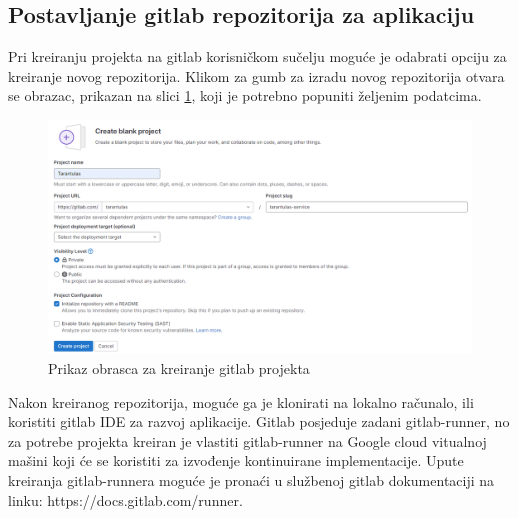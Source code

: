 \documentclass[a4paper,12pt,oneside]{article}
\begin{document}
\subsection{Postavljanje gitlab repozitorija za aplikaciju}

Pri kreiranju projekta na gitlab korisničkom sučelju moguće je odabrati opciju za kreiranje novog repozitorija. Klikom za gumb za izradu novog repozitorija otvara se obrazac, prikazan na slici \ref{fig:git-create-blank}, koji je potrebno popuniti željenim podatcima.

\begin{figure}
    \centering
    \includegraphics[width=1\linewidth]{Slike/git-create-blank-project.png}
    \caption{Prikaz obrasca za kreiranje gitlab projekta \cite{springArchitectureLayers}}
    \label{fig:git-create-blank}
\end{figure}

Nakon kreiranog repozitorija, moguće ga je klonirati na lokalno računalo, ili koristiti gitlab IDE za razvoj aplikacije. Gitlab posjeduje zadani gitlab-runner, no za potrebe projekta kreiran je vlastiti gitlab-runner na Google cloud vitualnoj mašini koji će se koristiti za izvođenje kontinuirane implementacije. Upute kreiranja gitlab-runnera moguće je pronaći u službenoj gitlab dokumentaciji na linku: https://docs.gitlab.com/runner.  
\end{document}

